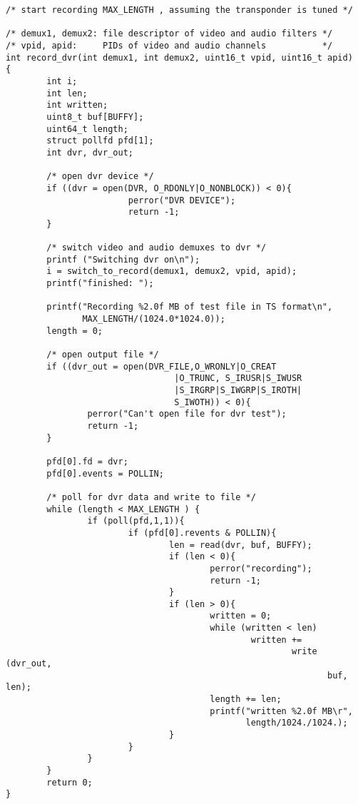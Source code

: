 {\begin{verbatim}
/* start recording MAX_LENGTH , assuming the transponder is tuned */

/* demux1, demux2: file descriptor of video and audio filters */
/* vpid, apid:     PIDs of video and audio channels           */
int record_dvr(int demux1, int demux2, uint16_t vpid, uint16_t apid)
{
        int i;
        int len;
        int written;
        uint8_t buf[BUFFY];
        uint64_t length;
        struct pollfd pfd[1];
        int dvr, dvr_out;

        /* open dvr device */
        if ((dvr = open(DVR, O_RDONLY|O_NONBLOCK)) < 0){
                        perror("DVR DEVICE");
                        return -1;
        }
        
        /* switch video and audio demuxes to dvr */
        printf ("Switching dvr on\n");
        i = switch_to_record(demux1, demux2, vpid, apid);
        printf("finished: ");
        
        printf("Recording %2.0f MB of test file in TS format\n",
               MAX_LENGTH/(1024.0*1024.0));
        length = 0;

        /* open output file */
        if ((dvr_out = open(DVR_FILE,O_WRONLY|O_CREAT
                                 |O_TRUNC, S_IRUSR|S_IWUSR
                                 |S_IRGRP|S_IWGRP|S_IROTH|
                                 S_IWOTH)) < 0){
                perror("Can't open file for dvr test");
                return -1;
        }

        pfd[0].fd = dvr;
        pfd[0].events = POLLIN;

        /* poll for dvr data and write to file */
        while (length < MAX_LENGTH ) {
                if (poll(pfd,1,1)){
                        if (pfd[0].revents & POLLIN){
                                len = read(dvr, buf, BUFFY);
                                if (len < 0){
                                        perror("recording");
                                        return -1;
                                }
                                if (len > 0){
                                        written = 0;
                                        while (written < len) 
                                                written += 
                                                        write (dvr_out, 
                                                               buf, len);
                                        length += len;
                                        printf("written %2.0f MB\r",
                                               length/1024./1024.);
                                }
                        }
                }
        }
        return 0;
}

\end{verbatim}
}
